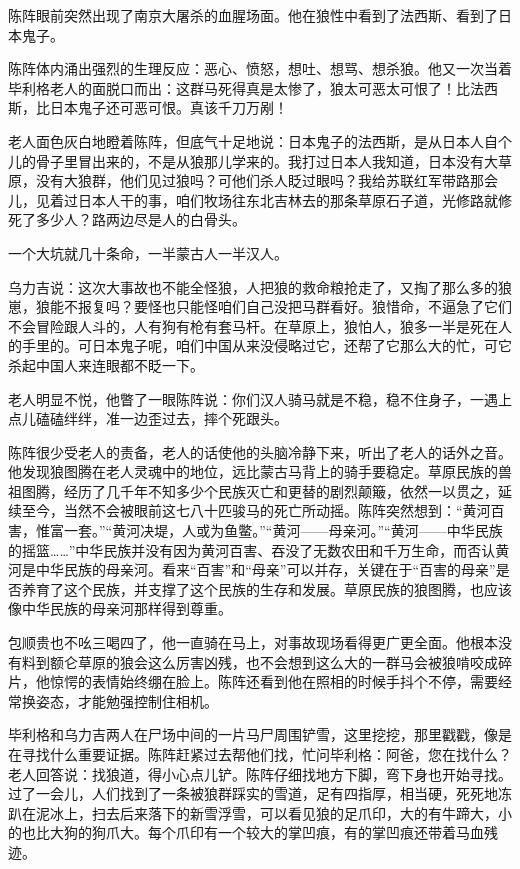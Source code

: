 \par 陈阵眼前突然出现了南京大屠杀的血腥场面。他在狼性中看到了法西斯、看到了日本鬼子。
\par 陈阵体内涌出强烈的生理反应：恶心、愤怒，想吐、想骂、想杀狼。他又一次当着毕利格老人的面脱口而出：这群马死得真是太惨了，狼太可恶太可恨了！比法西斯，比日本鬼子还可恶可恨。真该千刀万剐！
\par 老人面色灰白地瞪着陈阵，但底气十足地说：日本鬼子的法西斯，是从日本人自个儿的骨子里冒出来的，不是从狼那儿学来的。我打过日本人我知道，日本没有大草原，没有大狼群，他们见过狼吗？可他们杀人眨过眼吗？我给苏联红军带路那会儿，见着过日本人干的事，咱们牧场往东北吉林去的那条草原石子道，光修路就修死了多少人？路两边尽是人的白骨头。
\par 一个大坑就几十条命，一半蒙古人一半汉人。
\par 乌力吉说：这次大事故也不能全怪狼，人把狼的救命粮抢走了，又掏了那么多的狼崽，狼能不报复吗？要怪也只能怪咱们自己没把马群看好。狼惜命，不逼急了它们不会冒险跟人斗的，人有狗有枪有套马杆。在草原上，狼怕人，狼多一半是死在人的手里的。可日本鬼子呢，咱们中国从来没侵略过它，还帮了它那么大的忙，可它杀起中国人来连眼都不眨一下。
\par 老人明显不悦，他瞥了一眼陈阵说：你们汉人骑马就是不稳，稳不住身子，一遇上点儿磕磕绊绊，准一边歪过去，摔个死跟头。
\par 陈阵很少受老人的责备，老人的话使他的头脑冷静下来，听出了老人的话外之音。他发现狼图腾在老人灵魂中的地位，远比蒙古马背上的骑手要稳定。草原民族的兽祖图腾，经历了几千年不知多少个民族灭亡和更替的剧烈颠簸，依然一以贯之，延续至今，当然不会被眼前这七八十匹骏马的死亡所动摇。陈阵突然想到：“黄河百害，惟富一套。”“黄河决堤，人或为鱼鳖。”“黄河——母亲河。”“黄河——中华民族的摇篮……”中华民族并没有因为黄河百害、吞没了无数农田和千万生命，而否认黄河是中华民族的母亲河。看来“百害”和“母亲”可以并存，关键在于“百害的母亲”是否养育了这个民族，并支撑了这个民族的生存和发展。草原民族的狼图腾，也应该像中华民族的母亲河那样得到尊重。
\par 包顺贵也不吆三喝四了，他一直骑在马上，对事故现场看得更广更全面。他根本没有料到额仑草原的狼会这么厉害凶残，也不会想到这么大的一群马会被狼啃咬成碎片，他惊愕的表情始终绷在脸上。陈阵还看到他在照相的时候手抖个不停，需要经常换姿态，才能勉强控制住相机。
\par 
\par 毕利格和乌力吉两人在尸场中间的一片马尸周围铲雪，这里挖挖，那里戳戳，像是在寻找什么重要证据。陈阵赶紧过去帮他们找，忙问毕利格：阿爸，您在找什么？老人回答说：找狼道，得小心点儿铲。陈阵仔细找地方下脚，弯下身也开始寻找。过了一会儿，人们找到了一条被狼群踩实的雪道，足有四指厚，相当硬，死死地冻趴在泥冰上，扫去后来落下的新雪浮雪，可以看见狼的足爪印，大的有牛蹄大，小的也比大狗的狗爪大。每个爪印有一个较大的掌凹痕，有的掌凹痕还带着马血残迹。
